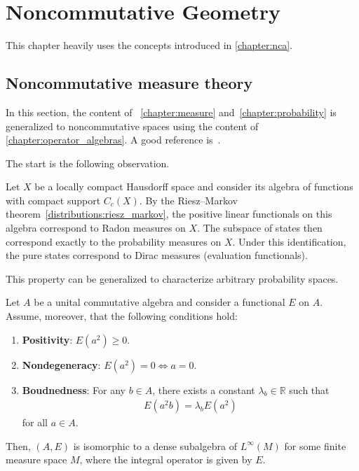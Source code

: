 \chapter{Noncommutative Geometry}\label{chapter:NCG}

    This chapter heavily uses the concepts introduced in \cref{chapter:nca}.

\section{Noncommutative measure theory}\label{section:noncommutative_measure_theory}

    In this section, the content of ~\ref{chapter:measure} and~\ref{chapter:probability} is generalized to noncommutative spaces using the content of \cref{chapter:operator_algebras}. A good reference is~\citet{segal_algebraic_1965}.

    The start is the following observation.
    \begin{property}
        Let $X$ be a locally compact Hausdorff space and consider its algebra of functions with compact support $C_c(X)$. By the Riesz--Markov theorem~\ref{distributions:riesz_markov}, the positive linear functionals on this algebra correspond to Radon measures on $X$. The subspace of states then correspond exactly to the probability measures on $X$. Under this identification, the pure states correspond to Dirac measures (evaluation functionals).
    \end{property}

    This property can be generalized to characterize arbitrary probability spaces.
    \begin{property}\label{ncg:measure}
        Let $A$ be a unital commutative algebra and consider a functional $E$ on $A$. Assume, moreover, that the following conditions hold:
        \begin{enumerate}
            \item\textbf{Positivity}: $E(a^2)\geq0$.
            \item\textbf{Nondegeneracy}: $E(a^2)=0\iff a=0$.
            \item\textbf{Boudnedness}: For any $b\in A$, there exists a constant $\lambda_b\in\mathbb{R}$ such that
            \begin{gather}
                E(a^2b) = \lambda_bE(a^2)
            \end{gather}
            for all $a\in A$.
        \end{enumerate}
        Then, $(A,E)$ is isomorphic to a dense subalgebra of $L^\infty(M)$ for some finite measure space $M$, where the integral operator is given by $E$.
    \end{property}

